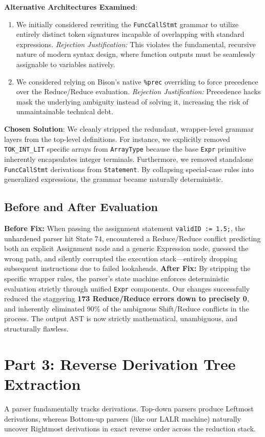 \documentclass[12pt, a4paper]{article}
\begin{document}
\textbf{Alternative Architectures Examined}: 
\begin{enumerate}
    \item We initially considered rewriting the \texttt{FuncCallStmt} grammar to utilize entirely distinct token signatures incapable of overlapping with standard expressions. \textit{Rejection Justification:} This violates the fundamental, recursive nature of modern syntax design, where function outputs must be seamlessly assignable to variables natively.
    \item We considered relying on Bison's native \texttt{\%prec} overriding to force precedence over the Reduce/Reduce evaluation. \textit{Rejection Justification:} Precedence hacks mask the underlying ambiguity instead of solving it, increasing the risk of unmaintainable technical debt.
\end{enumerate}

\textbf{Chosen Solution}: We cleanly stripped the redundant, wrapper-level grammar layers from the top-level definitions. For instance, we explicitly removed \texttt{TOK\_INT\_LIT} specific arrays from \texttt{ArrayType} because the base \texttt{Expr} primitive inherently encapsulates integer terminals. Furthermore, we removed standalone \texttt{FuncCallStmt} derivations from \texttt{Statement}. By collapsing special-case rules into generalized expressions, the grammar became naturally deterministic.

\subsection{Before and After Evaluation}
\textbf{Before Fix:}
When passing the assignment statement \texttt{validID := 1.5;}, the unhardened parser hit State 74, encountered a Reduce/Reduce conflict predicting both an explicit Assignment node and a generic Expression node, guessed the wrong path, and silently corrupted the execution stack—entirely dropping subsequent instructions due to failed lookaheads.
\newline
\textbf{After Fix:}
By stripping the specific wrapper rules, the parser's state machine enforces deterministic evaluation strictly through unified \texttt{Expr} components. Our changes successfully reduced the staggering \textbf{173 Reduce/Reduce errors down to precisely 0}, and inherently eliminated 90\% of the ambiguous Shift/Reduce conflicts in the process. The output AST is now strictly mathematical, unambiguous, and structurally flawless.

\section{Part 3: Reverse Derivation Tree Extraction}
A parser fundamentally tracks derivations. Top-down parsers produce Leftmost derivations, whereas Bottom-up parsers (like our LALR machine) naturally uncover Rightmost derivations in exact reverse order across the reduction stack.
\end{document}
